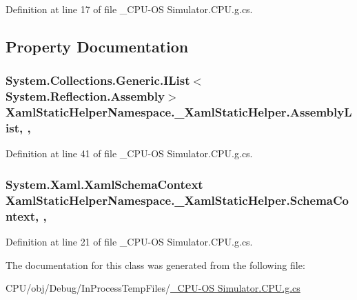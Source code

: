 Definition at line 17 of file \+\_\+\+C\+P\+U-\/\+O\+S Simulator.\+C\+P\+U.\+g.\+cs.



\subsection{Property Documentation}
\hypertarget{class_xaml_static_helper_namespace_1_1___xaml_static_helper_ac4dcc401ff305c0953427d881506455f}{}
\subsubsection[{Assembly\+List}]{\setlength{\rightskip}{0pt plus 5cm}System.\+Collections.\+Generic.\+I\+List$<$System.\+Reflection.\+Assembly$>$ Xaml\+Static\+Helper\+Namespace.\+\_\+\+Xaml\+Static\+Helper.\+Assembly\+List\hspace{0.3cm}{\ttfamily [static]}, {\ttfamily [get]}, {\ttfamily [package]}}\label{class_xaml_static_helper_namespace_1_1___xaml_static_helper_ac4dcc401ff305c0953427d881506455f}


Definition at line 41 of file \+\_\+\+C\+P\+U-\/\+O\+S Simulator.\+C\+P\+U.\+g.\+cs.

\hypertarget{class_xaml_static_helper_namespace_1_1___xaml_static_helper_a703c877fd6ad70d1add0c1cfda1de3a1}{}
\subsubsection[{Schema\+Context}]{\setlength{\rightskip}{0pt plus 5cm}System.\+Xaml.\+Xaml\+Schema\+Context Xaml\+Static\+Helper\+Namespace.\+\_\+\+Xaml\+Static\+Helper.\+Schema\+Context\hspace{0.3cm}{\ttfamily [static]}, {\ttfamily [get]}, {\ttfamily [package]}}\label{class_xaml_static_helper_namespace_1_1___xaml_static_helper_a703c877fd6ad70d1add0c1cfda1de3a1}


Definition at line 21 of file \+\_\+\+C\+P\+U-\/\+O\+S Simulator.\+C\+P\+U.\+g.\+cs.



The documentation for this class was generated from the following file\+:\begin{DoxyCompactItemize}
\item 
C\+P\+U/obj/\+Debug/\+In\+Process\+Temp\+Files/\hyperlink{___c_p_u-_o_s_01_simulator_8_c_p_u_8g_8cs}{\+\_\+\+C\+P\+U-\/\+O\+S Simulator.\+C\+P\+U.\+g.\+cs}\end{DoxyCompactItemize}
